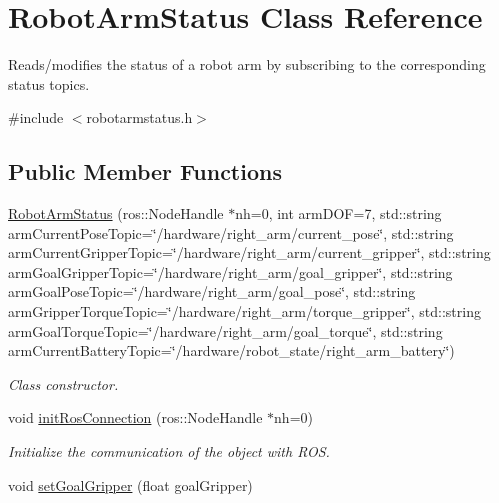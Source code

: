 \hypertarget{class_robot_arm_status}{}\section{Robot\+Arm\+Status Class Reference}
\label{class_robot_arm_status}


Reads/modifies the status of a robot arm by subscribing to the corresponding status topics.  




{\ttfamily \#include $<$robotarmstatus.\+h$>$}

\subsection*{Public Member Functions}
\begin{DoxyCompactItemize}
\item 
\hyperlink{class_robot_arm_status_a0d010c81263f836dee5698c1d4e8728d}{Robot\+Arm\+Status} (ros\+::\+Node\+Handle $\ast$nh=0, int arm\+D\+OF=7, std\+::string arm\+Current\+Pose\+Topic=\char`\"{}/hardware/right\+\_\+arm/current\+\_\+pose\char`\"{}, std\+::string arm\+Current\+Gripper\+Topic=\char`\"{}/hardware/right\+\_\+arm/current\+\_\+gripper\char`\"{}, std\+::string arm\+Goal\+Gripper\+Topic=\char`\"{}/hardware/right\+\_\+arm/goal\+\_\+gripper\char`\"{}, std\+::string arm\+Goal\+Pose\+Topic=\char`\"{}/hardware/right\+\_\+arm/goal\+\_\+pose\char`\"{}, std\+::string arm\+Gripper\+Torque\+Topic=\char`\"{}/hardware/right\+\_\+arm/torque\+\_\+gripper\char`\"{}, std\+::string arm\+Goal\+Torque\+Topic=\char`\"{}/hardware/right\+\_\+arm/goal\+\_\+torque\char`\"{}, std\+::string arm\+Current\+Battery\+Topic=\char`\"{}/hardware/robot\+\_\+state/right\+\_\+arm\+\_\+battery\char`\"{})
\begin{DoxyCompactList}\small\item\em Class constructor. \end{DoxyCompactList}\item 
void \hyperlink{class_robot_arm_status_aa51004d359020b3280d1c4d498f50b6f}{init\+Ros\+Connection} (ros\+::\+Node\+Handle $\ast$nh=0)
\begin{DoxyCompactList}\small\item\em Initialize the communication of the object with R\+OS. \end{DoxyCompactList}\item 
void \hyperlink{class_robot_arm_status_a23bcf9f86fa9a7c3ddc306d892a74336}{set\+Goal\+Gripper} (float goal\+Gripper)

\end{DoxyCompactItemize}
